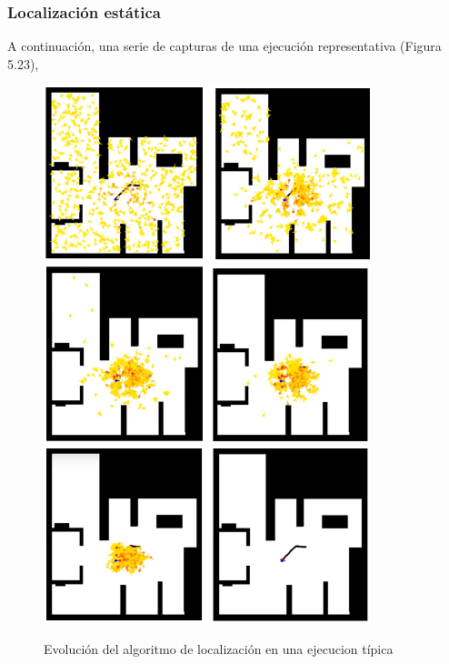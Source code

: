 \subsubsection{Localización estática}
A continuación, una serie de capturas de una ejecución representativa (Figura 5.23),

\begin{figure}[H]
	\begin{center}
		\includegraphics[width=0.850\textwidth]{figures/lloutput1.png}
		\includegraphics[width=0.850\textwidth]{figures/lloutput2.png}
		\includegraphics[width=0.850\textwidth]{figures/lloutput3.png}
		\caption{Evolución del algoritmo de localización en una ejecucion típica}
		\label{fig.outputll}
		\end{center}
\end{figure}

